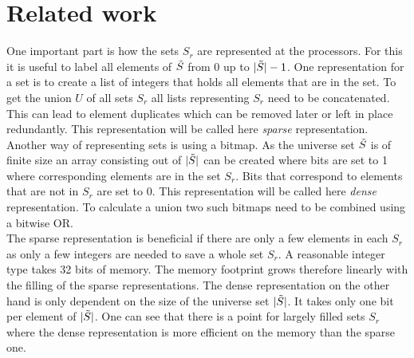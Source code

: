 \documentclass[a4paper,%
	12pt,%
	DIV14,
	headsepline,%
	headings=normal,
]{scrartcl}
\theoremstyle{definition}
\theoremstyle{remark}
\begin{document}
\section{Related work}
One important part is how the sets $S_r$ are represented at the processors. For this it is useful to label all elements of $\Tilde{S}$ from $0$ up to $|\Tilde{S}|-1$. One representation for a set is to create a list of integers that holds all elements that are in the set. To get the union $U$ of all sets $S_r$ all lists representing $S_r$ need to be concatenated. This can lead to element duplicates which can be removed later or left in place redundantly. This representation will be called here \emph{sparse} representation. \\
Another way of representing sets is using a bitmap. As the universe set $\Tilde{S}$ is of finite size an array consisting out of $|\Tilde{S}|$ can be created where bits are set to 1 where corresponding elements are in the set $S_r$. Bits that correspond to elements that are not in $S_r$ are set to $0$. This representation  will be called here \emph{dense} representation. To calculate a union two such bitmaps need to be combined using a bitwise OR. \cite{graphPartitioning}\\
The sparse representation is beneficial if there are only a few elements in each $S_r$ as only a few integers are needed to save a whole set $S_r$. A reasonable integer type takes 32 bits of memory. The memory footprint grows therefore linearly with the filling of the sparse representations. The dense representation on the other hand is only dependent on the size of the universe set $|\Tilde{S}|$. It takes only one bit per element of $|\Tilde{S}|$. One can see that there is a point for largely filled sets $S_r$ where the dense representation is more efficient on the memory than the sparse one.
\end{document}
